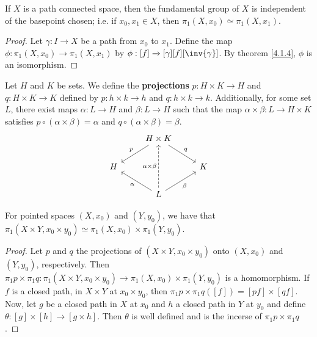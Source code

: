 \begin{theorem}\label{4.2.3}
    If $X$ is a path connected space, then the fundamental group of $X$ is
    independent of the basepoint chosen; i.e. if $x_0,x_1 \in X$, then
    $\pi_1(X,x_0) \simeq \pi_1(X,x_1)$.
\end{theorem}
\begin{proof}
    Let $\gamma:I \xrightarrow{} X$ be a path from $x_0$ to $x_1$. Define the
    map $\phi:\pi_1(X,x_0) \xrightarrow{} \pi_1(X,x_1)$ by $\phi:[f]
    \xrightarrow{} [\gamma][f][\inv{\gamma}]$. By theorem \ref{4.1.4}, $\phi$ is
    an isomorphism.
\end{proof}

\begin{definition}
    Let $H$ and  $K$ be sets. We define the  \textbf{projections} $p:H \times K
    \xrightarrow{} H$ and $q:H \times K \xrightarrow{} K$ defined by $p:h \times
    k \xrightarrow{} h$ and $q:h \times k \xrightarrow{} k$. Additionally, for
    some set $L$, there exist maps $\alpha:L \xrightarrow{} H$ and $\beta:L
    \xrightarrow{} H$ such that the map $\alpha \times \beta:L \xrightarrow{} H
    \times K$ satisfies $p \circ (\alpha \times \beta)=\alpha$ and $q \circ
    (\alpha \times \beta)=\beta$.
    \[\begin{tikzcd}
        & {H \times K} \\
        H && K \\
        & L
        \arrow["p"', from=1-2, to=2-1]
        \arrow["q", from=1-2, to=2-3]
        \arrow["\beta"', from=3-2, to=2-3]
        \arrow["\alpha", from=3-2, to=2-1]
        \arrow["{\alpha \times \beta}", dashed, from=3-2, to=1-2]
    \end{tikzcd}\]
\end{definition}

\begin{theorem}\label{4.2.4}
    For pointed spaces $(X,x_0)$ and $(Y,y_0)$, we have that $\pi_1(X \times Y,
    x_0 \times y_0) \simeq \pi_1(X,x_0) \times \pi_1(Y,y_0)$.
\end{theorem}
\begin{proof}
    Let $p$ and  $q$ the projections of  $(X \times Y, x_0 \times y_0)$ onto
    $(X,x_0)$ and $(Y,y_0)$, respectively. Then $\pi_1{p} \times
    \pi_1{q}:\pi_1(X \times Y,x_0 \times y_0) \xrightarrow{} \pi_1(X,x_0) \times
    \pi_1(Y,y_0)$ is a homomorphism. If $f$ is a closed path, in  $X \times Y$
    at  $x_0 \times y_0$, then $\pi_1{p} \times \pi_1{q}([f])=[pf] \times [qf]$.
    Now, let $g$ be a closed path in  $X$ at  $x_0$ and $h$ a closed path in
    $Y$ at  $y_0$ and define $\theta:[g] \times [h] \xrightarrow{} [g \times
    h]$. Then $\theta$ is well defined and is the incerse of  $\pi_1{p} \times
    \pi_1{q}$.
\end{proof}

